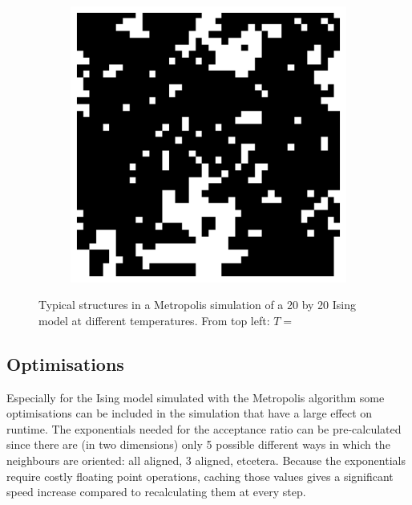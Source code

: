 \documentclass[11pt, a4paper]{report} %
\begin{document}
\begin{figure}[htb]
\begin{subfigure}[c]{0.2\linewidth}
	\end{subfigure}
	~
	\begin{subfigure}[c]{0.2\linewidth}
		\includegraphics[width=\linewidth]{20160603125617_40_by_40_Lattice_step200.pdf}
	\end{subfigure}

	\caption{Typical structures in a Metropolis simulation of a 20 by 20 Ising model at different temperatures. From top left: \(T=\)}
	\label{fig:metropolis_ising_at_temps}
\end{figure}

\subsection{Optimisations}
Especially for the Ising model simulated with the Metropolis algorithm some optimisations can be included in the simulation that have a large effect on runtime.
The exponentials needed for the acceptance ratio can be pre-calculated since there are (in two dimensions) only 5 possible different ways in which the neighbours are oriented:
all aligned, 3 aligned, etcetera.
Because the exponentials require costly floating point operations, caching those values gives a significant speed increase compared to recalculating them at every step.
\end{document}
